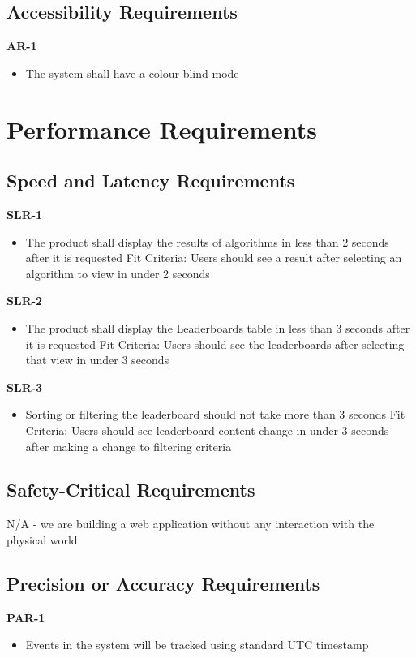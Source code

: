 \documentclass[12pt]{article}
\begin{document}
\subsection{Accessibility Requirements}
\textbf{AR-1}
\begin{itemize}
    \item The system shall have a colour-blind mode
\end{itemize}

\section{Performance Requirements}
\subsection{Speed and Latency Requirements}
\textbf{SLR-1}
\begin{itemize}
\item The product shall display the results of algorithms in less than 2 seconds after it is requested \hfill \break
Fit Criteria: Users should see a result after selecting an algorithm to view in under 2 seconds
\end{itemize}
\textbf{SLR-2}
\begin{itemize}
\item The product shall display the Leaderboards table in less than 3 seconds after it is requested \hfill \break
Fit Criteria: Users should see the leaderboards after selecting that view in under 3 seconds
\end{itemize}
\textbf{SLR-3}
\begin{itemize}
\item Sorting or filtering the leaderboard should not take more than 3 seconds \hfill \break
Fit Criteria: Users should see leaderboard content change in under 3 seconds after making a change to filtering criteria
\end{itemize}


\subsection{Safety-Critical Requirements}
N/A - we are building a web application without any interaction with the physical world
\subsection{Precision or Accuracy Requirements}
\textbf{PAR-1}
\begin{itemize}
    \item Events in the system will be tracked using standard UTC timestamp
\end{itemize}
\end{document}
